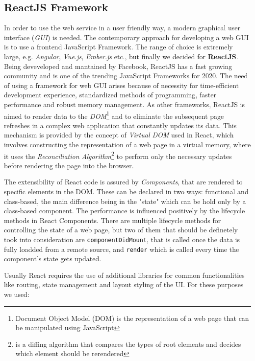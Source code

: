 \subsection{ReactJS Framework}
In order to use the web service in a user friendly way, a modern graphical user interface (\textit{GUI}) is needed. The contemporary approach for developing a web GUI is to use a frontend JavaScript Framework. The range of choice is extremely large, e.g. \textit{Angular}, \textit{Vue.js}, \textit{Ember.js} etc., but finally we decided for \textbf{ReactJS}. Being deveveloped and mantained by Facebook, ReactJS has a fast growing community and is one of the trending JavaScript Frameworks for 2020. The need of using a framework for web GUI arises because of necessity for time-efficient development experience, standardized methods of programming, faster performance and robust memory management. As other frameworks, ReactJS is aimed to render data to the \textit{DOM}\footnote{Document Object Model (DOM) is the representation of a web page that can be manipulated using JavaScript} and to eliminate the subsequent page refreshes in a complex web application that constantly updates its data. This mechanism is provided by the concept of \textit{Virtual DOM} used in React, which involves constructing the representation of a web page in a virtual memory, where it uses the \textit{Reconciliation Algorithm}\footnote{is a diffing algorithm that compares the types of root elements and decides which element should be rerendered} to perform only the necessary updates before rendering the page into the browser. \par
The extensibility of React code is assured by \textit{Components}, that are rendered to specific elements in the DOM. These can be declared in two ways: functional and class-based, the main difference being in the "state" which can be hold only by a class-based component. The performance is influenced positively by the lifecycle methods in React Components. There are multiple lifecycle methods for controlling the state of a web page, but two of them that should be definetely took into consideration are \texttt{componentDidMount}, that is called once the data is fully loadded from a remote source, and \texttt{render} which is called every time the component's state gets updated. \par
Usually React requires the use of additional libraries for common functionalities like routing, state management and layout styling of the UI. For these purposes we used:

